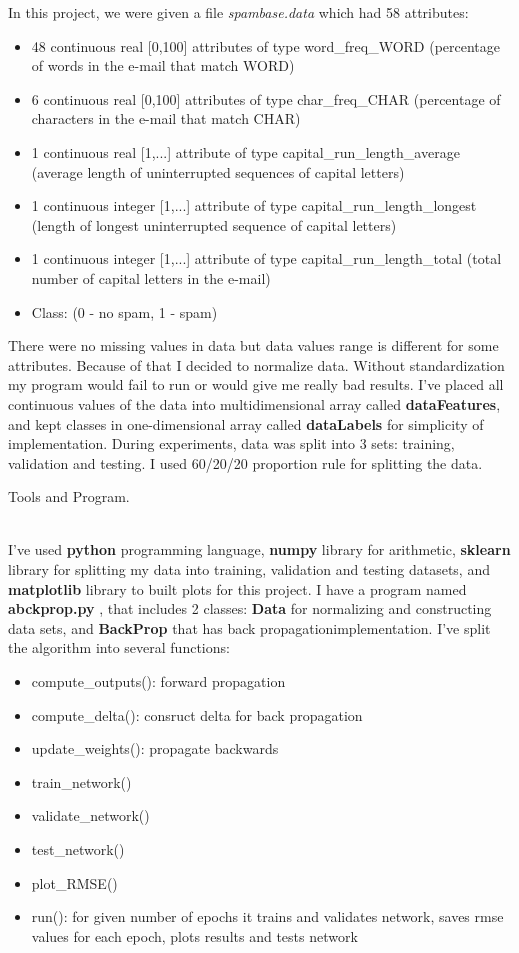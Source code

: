 \documentclass[12pt, letterpaper]{article}
\begin{document}
\begin{enumerate}[label=\Roman*.]
	 In this project, we were given a file {\it spambase.data} which had 58 attributes:
	 \begin{itemize}
	 	\item 48 continuous real [0,100] attributes of type word\_freq\_WORD (percentage of words in the e-mail that match WORD)
		\item 6 continuous real [0,100] attributes of type char\_freq\_CHAR (percentage of characters in the e-mail that match CHAR)
		\item 1 continuous real [1,...] attribute of type capital\_run\_length\_average (average length of uninterrupted sequences of capital letters)
		\item 1 continuous integer [1,...] attribute of type capital\_run\_length\_longest (length of longest uninterrupted sequence of capital letters)
		\item 1 continuous integer [1,...] attribute of type capital\_run\_length\_total (total number of capital letters in the e-mail)
		\item Class: (0 - no spam, 1 -  spam)
	\end{itemize}
	
	There were no missing values in data but data values range is different for some attributes. Because of that I decided to normalize data. Without standardization my program would fail to run or would give me really bad results.
	I've placed all continuous values of the data into multidimensional array called {\bf dataFeatures}, and kept classes in one-dimensional array called {\bf dataLabels} for simplicity of implementation. During experiments, data was split into 3 sets: training, validation and testing. I used 60/20/20 proportion rule for splitting the data. 
		
	{\bf \item Tools and Program.}\\
	
	I've used {\bf python} programming language, {\bf numpy} library for arithmetic, {\bf sklearn} library for splitting my data into training, validation and testing datasets, and {\bf matplotlib} library to built plots for this project. I have a program named {\bf abckprop.py} , that includes 2 classes: {\bf Data} for normalizing and constructing data sets, and {\bf BackProp} that has back propagationimplementation. I've split the algorithm into several functions:
	\begin{itemize}
		\item compute\_outputs(): forward propagation
		\item compute\_delta(): consruct delta for back propagation
		\item update\_weights(): propagate backwards
		\item train\_network()
		\item validate\_network()
		\item test\_network()
		\item plot\_RMSE()
		\item run(): for given number of epochs it trains and validates network, saves rmse values for each epoch, plots results and tests network
	\end{itemize}
	

\end{enumerate}
\end{document}
